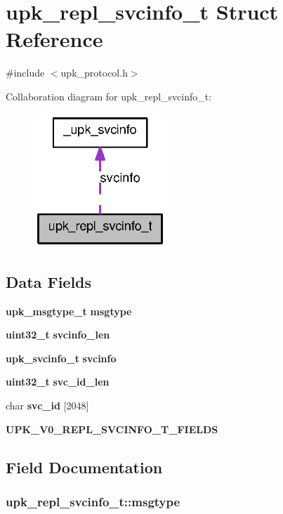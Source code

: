 \section{upk\_\-repl\_\-svcinfo\_\-t Struct Reference}
\label{structupk__repl__svcinfo__t}


{\ttfamily \#include $<$upk\_\-protocol.h$>$}



Collaboration diagram for upk\_\-repl\_\-svcinfo\_\-t:
\nopagebreak
\begin{figure}[H]
\begin{center}
\leavevmode
\includegraphics[width=142pt]{structupk__repl__svcinfo__t__coll__graph}
\end{center}
\end{figure}
\subsection*{Data Fields}
\begin{DoxyCompactItemize}
\item 
{\bf upk\_\-msgtype\_\-t} {\bf msgtype}
\item 
{\bf uint32\_\-t} {\bf svcinfo\_\-len}
\item 
{\bf upk\_\-svcinfo\_\-t} {\bf svcinfo}
\item 
{\bf uint32\_\-t} {\bf svc\_\-id\_\-len}
\item 
char {\bf svc\_\-id} [2048]
\item 
{\bf UPK\_\-V0\_\-REPL\_\-SVCINFO\_\-T\_\-FIELDS}
\end{DoxyCompactItemize}


\subsection{Field Documentation}
\subsubsection[{msgtype}]{ {\bf upk\_\-repl\_\-svcinfo\_\-t::msgtype}}\label{structupk__repl__svcinfo__t_a9cfcc8761c682a5523b62dcf0673b569}
